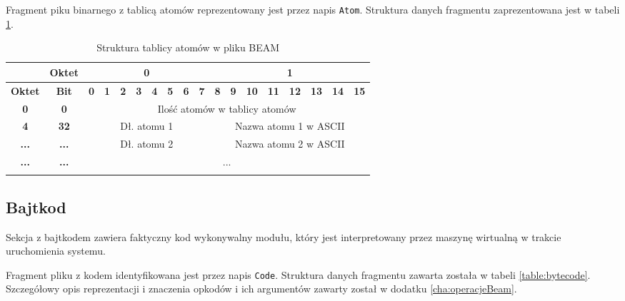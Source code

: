 Fragment piku binarnego z tablicą atomów reprezentowany jest przez napis \texttt{Atom}. Struktura danych fragmentu zaprezentowana jest w tabeli \ref{table:atomTable}.

\begin{longtable}{|c|c|c|c|c|c|c|c|c|c|c|c|c|c|c|c|c|c|}
\hline
         & \textbf{Oktet} & \multicolumn{8}{|c|}{\textbf{0}} & \multicolumn{8}{|c|}{\textbf{1}} \\
\hline
\textbf{Oktet} & \textbf{Bit} & \textbf{0} & \textbf{1} & \textbf{2} & \textbf{3} & \textbf{4} & \textbf{5} & \textbf{6} & \textbf{7} & \textbf{8} & \textbf{9} & \textbf{10} & \textbf{11} & \textbf{12} & \textbf{13} & \textbf{14} & \textbf{15}\\
\hline
\textbf{0} & \textbf{0} & \multicolumn{16}{|c|}{Ilość atomów w tablicy atomów} \\[2ex]
\hline
\textbf{4} & \textbf{32} & \multicolumn{8}{|c|}{Dł. atomu 1} & \multicolumn{8}{|c|}{Nazwa atomu 1 w ASCII}\\[2ex]
\hline
\textbf{...} & \textbf{...} & \multicolumn{8}{|c|}{Dł. atomu 2} & \multicolumn{8}{|c|}{Nazwa atomu 2 w ASCII}\\[2ex]
\hline
\textbf{...} & \textbf{...} & \multicolumn{16}{|c|}{...} \\[2ex]
\hline
\caption{Struktura tablicy atomów w pliku BEAM}
\label{table:atomTable} \\
\end{longtable}

\subsection{Bajtkod}
Sekcja z bajtkodem zawiera faktyczny kod wykonywalny modułu, który jest interpretowany przez maszynę wirtualną w trakcie uruchomienia systemu.

Fragment pliku z kodem identyfikowana jest przez napis \texttt{Code}. Struktura danych fragmentu zawarta została w tabeli \ref{table:bytecode}. Szczegółowy opis reprezentacji i znaczenia opkodów i ich argumentów zawarty został w dodatku \ref{cha:operacjeBeam}.

